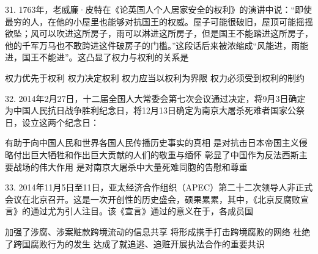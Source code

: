 31. 1763年，老威廉·皮特在《论英国人个人居家安全的权利》的演讲中说：“即使最穷的人，在他的小屋里也能够对抗国王的权威。屋子可能很破旧，屋顶可能摇摇欲坠；风可以吹进这所房子，雨可以淋进这所房子，但是国王不能踏进这所房子，他的千军万马也不敢跨进这件破房子的门槛。”这段话后来被浓缩成“风能进，雨能进，国王不能进”。这凸显了权力与权利的关系是
\begin{choices}
	 权力优先于权利
	 权力决定权利
	 权力应当以权利为界限
	 权力必须受到权利的制约
\end{choices}
32. 2014年2月27日，十二届全国人大常委会第七次会议通过决定，将9月3日确定为中国人民抗日战争胜利纪念日，将12月13日确定为南京大屠杀死难者国家公祭日，设立这两个纪念日：
\begin{choices}
	 有助于向中国人民和世界各国人民传播历史事实的真相
	 是对抗击日本帝国主义侵略付出巨大牺牲和作出巨大贡献的人们的敬重与缅怀
	 彰显了中国作为反法西斯主要战场的伟大作用
	 是对南京大屠杀中大量死难同胞的告慰和尊重
\end{choices}
33. 2014年11月5日至11日，亚太经济合作组织（APEC）第二十二次领导人非正式会议在北京召开。这是一次开创性的历史盛会，硕果累累，其中，《北京反腐败宣言》的通过尤为引人注目。该《宣言》通过的意义在于，各成员国
\begin{choices}
	 加强了涉腐、涉案赃款跨境流动的信息共享
	 将形成携手打击跨境腐败的网络
	 杜绝了跨国腐败行为的发生
	 达成了就追逃、追赃开展执法合作的重要共识
\end{choices}
\vspace{6pt}
